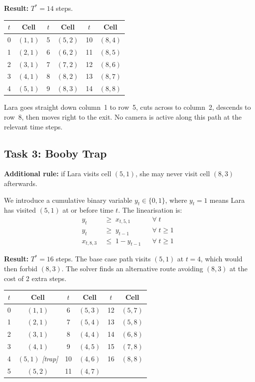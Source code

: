 \documentclass[12pt,a4paper]{article}
\begin{document}
\medskip
\textbf{Result:} $T^*=14$ steps.

\begin{center}
\begin{tabular}{cc|cc|cc}
\toprule
$t$ & Cell & $t$ & Cell & $t$ & Cell \\
\midrule
 0 & $(1,1)$ &  5 & $(5,2)$ & 10 & $(8,4)$ \\
 1 & $(2,1)$ &  6 & $(6,2)$ & 11 & $(8,5)$ \\
 2 & $(3,1)$ &  7 & $(7,2)$ & 12 & $(8,6)$ \\
 3 & $(4,1)$ &  8 & $(8,2)$ & 13 & $(8,7)$ \\
 4 & $(5,1)$ &  9 & $(8,3)$ & 14 & $(8,8)$ \\
\bottomrule
\end{tabular}
\end{center}

Lara goes straight down column~1 to row~5, cuts across to column~2, descends to row~8,
then moves right to the exit. No camera is active along this path at the relevant time
steps.

\subsection*{Task 3: Booby Trap}

\textbf{Additional rule:} if Lara visits cell $(5,1)$, she may never visit cell $(8,3)$
afterwards.

We introduce a cumulative binary variable $y_t\in\{0,1\}$, where $y_t=1$ means Lara has
visited $(5,1)$ at or before time $t$. The linearisation is:
\begin{align*}
  y_t &\;\geq\; x_{t,5,1} && \forall\;t \tag{trap triggered}\\
  y_t &\;\geq\; y_{t-1}   && \forall\;t\geq1 \tag{stays triggered}\\
  x_{t,8,3} &\;\leq\; 1-y_{t-1} && \forall\;t\geq1 \tag{block $(8,3)$ after trap}
\end{align*}

\textbf{Result:} $T^*=16$ steps. The base case path visits $(5,1)$ at $t=4$, which would
then forbid $(8,3)$. The solver finds an alternative route avoiding $(8,3)$ at the cost of
2 extra steps.

\begin{center}
\begin{tabular}{cc|cc|cc}
\toprule
$t$ & Cell & $t$ & Cell & $t$ & Cell \\
\midrule
 0 & $(1,1)$            &  6 & $(5,3)$ & 12 & $(5,7)$ \\
 1 & $(2,1)$            &  7 & $(5,4)$ & 13 & $(5,8)$ \\
 2 & $(3,1)$            &  8 & $(4,4)$ & 14 & $(6,8)$ \\
 3 & $(4,1)$            &  9 & $(4,5)$ & 15 & $(7,8)$ \\
 4 & $(5,1)$ \textit{[trap]} & 10 & $(4,6)$ & 16 & $(8,8)$ \\
 5 & $(5,2)$            & 11 & $(4,7)$ &    & \\
\bottomrule
\end{tabular}
\end{center}
\end{document}
